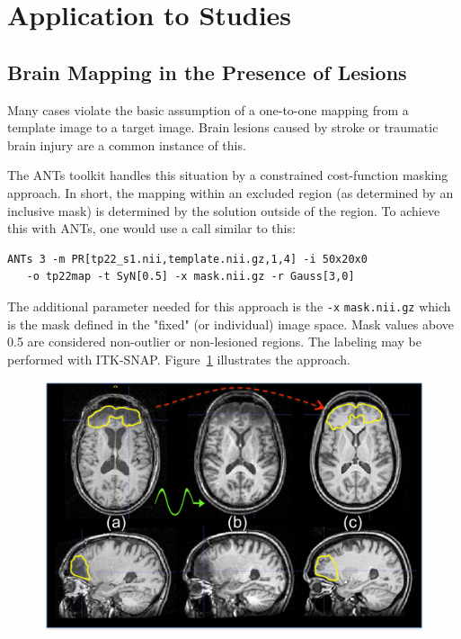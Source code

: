 \documentclass{InsightArticle}
\begin{document}
\section{Application to Studies}
\subsection{Brain Mapping in the Presence of Lesions}
Many cases violate the basic assumption of a one-to-one mapping from a
template image to a target image. Brain lesions caused by stroke or
traumatic brain injury are a common instance of this.

The ANTs toolkit handles this situation by a constrained cost-function
masking approach. In short, the mapping within an excluded region (as
determined by an inclusive mask) is determined by the solution outside
of the region. To achieve this with ANTs, one would use a call similar
to this:
\begin{verbatim}
ANTs 3 -m PR[tp22_s1.nii,template.nii.gz,1,4] -i 50x20x0
   -o tp22map -t SyN[0.5] -x mask.nii.gz -r Gauss[3,0] 
\end{verbatim}
The additional parameter needed for this approach 
is the \texttt{-x}  \texttt{mask.nii.gz}  which 
is the mask defined in the "fixed" (or individual) image space.  
Mask values above 0.5 are considered non-outlier or non-lesioned regions.
The labeling may be performed with ITK-SNAP. 
Figure~\ref{fig:lesion} illustrates the approach.
\begin{figure}
\includegraphics[width=1\textwidth]{Figures/lesionstudy.pdf}
\label{fig:lesion}
\end{figure}
\end{document}
